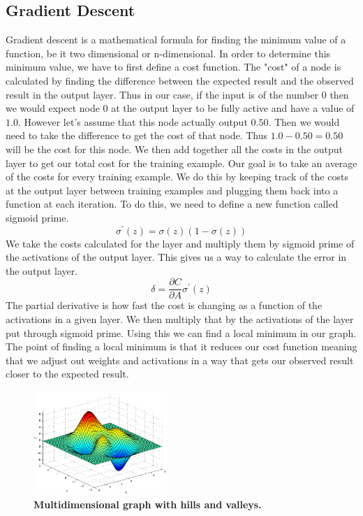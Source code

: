 \documentclass[12pt]{article}
\theoremstyle{definition}
\theoremstyle{plain}
\begin{document}
\subsection{Gradient Descent}
Gradient descent is a mathematical formula for finding the minimum value of a function, be it two dimensional or n-dimensional. In order to determine this minimum value, we have to first define a cost function. The "cost" of a node is calculated by finding the difference between the expected result and the observed result in the output layer. Thus in our case, if the input is of the number 0 then we would expect node 0 at the output layer to be fully active and have a value of $1.0$. However let's assume that this node actually output $0.50$. Then we would need to take the difference to get the cost of that node. Thus $1.0-0.50 = 0.50$ will be the cost for this node. We then add together all the costs in the output layer to get our total cost for the training example. Our goal is to take an average of the costs for every training example. We do this by keeping track of the costs at the output layer between training examples and plugging them back into a function at each iteration. To do this, we need to define a new function called sigmoid prime.
\begin{equation}\label{eqn:SigmoidPrime}
\sigma^\prime(z) = \sigma(z)(1-\sigma(z))
\end{equation}
We take the costs calculated for the layer and multiply them by sigmoid prime of the activations of the output layer. This gives us a way to calculate the error in the output layer.
\begin{equation}\label{eqn:Delta}
\delta = \dfrac{\partial C}{\partial A}\sigma^\prime(z)
\end{equation}
The partial derivative is how fast the cost is changing as a function of the activations in a given layer. We then multiply that by the activations of the layer put through sigmoid prime.  Using this we can find a local minimum in our graph. The point of finding a local minimum is that it reduces our cost function meaning that we adjust out weights and activations in a way that gets our observed result closer to the expected result. 
\begin{figure}
	\centering
	\includegraphics[width=0.45\textwidth]{Images/Gradient.png}
	\caption{\textbf{Multidimensional graph with hills and valleys.}}
\end{figure}
\end{document}
